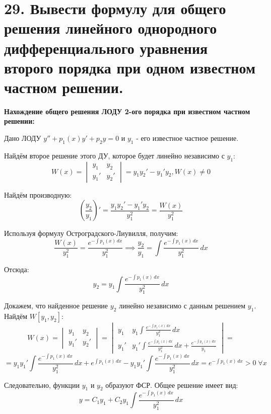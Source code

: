\documentclass[11pt]{article}
\begin{document}
\section*{29. Вывести формулу для общего решения линейного однородного дифференциального уравнения второго порядка при одном известном частном решении.}
\par\textbf{Нахождение общего решения ЛОДУ 2-ого порядка при известном частном решении:}
\par Дано ЛОДУ $y'' + p_{1}(x)y' + p_{2}y = 0$ и $y_{1}$ - его известное частное решение.
\par Найдём второе решение этого ДУ, которое будет линейно независимо с $y_{1}$:
$$W(x) = \begin{vmatrix}
y_{1} & y_{2}  \\
y_{1}' & y_{2}'
\end{vmatrix} = y_{1}y_{2}' - y_{1}'y_{2}, W(x) \neq 0$$
\par Найдём производную:
$$\left( \frac{y_{2}}{y_{1}} \right)' = \frac{y_{1}y_{2}' - y_{1}'y_{2}}{y_{1}^2} = \frac{W(x)}{y_{1}^2}$$
\par Используя формулу Остроградского-Лиувилля, получим:
$$\frac{W(x)}{y_{1}^2} = \frac{e^{-\int p_{1}(x) \, dx }}{y_{1}^2} \implies \frac{y_{2}}{y_{1}} = \int \frac{e^{-\int p_{1}(x) \, dx }}{y_{1}^2} \, dx$$
\par Отсюда:$$y_{2} = y_{1} \int \frac{e^{-\int p_{1}(x) \, dx }}{y_{1}^2} \, dx$$
\par Докажем, что найденное решение $y_{2}$ линейно независимо с данным решением $y_{1}$. Найдём $W[y_{1}, y_{2}]$:
$$W(x) = \begin{vmatrix}
y_{1} & y_{2}  \\
y_{1}' & y_{2}'
\end{vmatrix} = 
\begin{vmatrix}
y_{1} & y_{1} \int \frac{e^{-\int p_{1}(x) \, dx }}{y_{1}^2} \, dx   \\
y_{1}' & y_{1}'\int \frac{e^{-\int p_{1}(x) \, dx }}{y_{1}^2} \, dx + \frac{e^{-\int p_{1}(x) \, dx }}{y_{1}} 
\end{vmatrix} =$$
$$= y_{1}y_{1}'\int \frac{e^{-\int p_{1}(x) \, dx }}{y_{1}^2} \, dx + e^{\int p_{1}(x) \, dx } - y_{1}y_{1}'\int \frac{e^{-\int p_{1}(x) \, dx }}{y_{1}^2} \, dx = e^{-\int p_{1}(x) \, dx} > 0 \; \forall x$$
\par Следовательно, функции $y_{1}$ и $y_{2}$ образуют ФСР. Общее решение имеет вид:
$$y=C_{1}y_{1} + C_{2}y_{1}\int \frac{e^{-\int p_{1}(x) \, dx }}{y_{1}^2} \, dx $$
\end{document}
